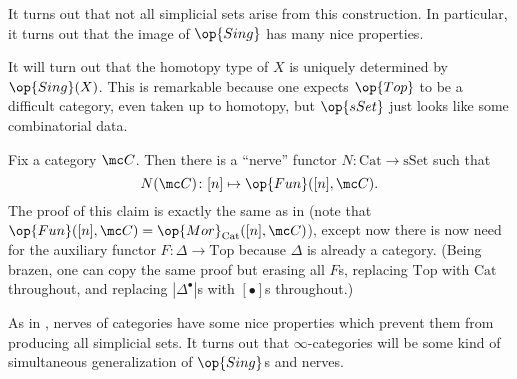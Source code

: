 \documentclass[../notes.tex]{subfiles}
\begin{document}
\begin{remark} \label{rem:more-sset-than-sing}
	It turns out that not all simplicial sets arise from this construction. In particular, it turns out that the image of $\op{Sing}$ has many nice properties. %
\end{remark}
\begin{remark}
	It will turn out that the homotopy type of $X$ is uniquely determined by $\op{Sing}(X)$. This is remarkable because one expects $\op{Top}$ to be a difficult category, even taken up to homotopy, but $\op{sSet}$ just looks like some combinatorial data.
\end{remark}
\begin{example}[nerve] \label{ex:nerve}
	Fix a category $\mc C$. Then there is a ``nerve'' functor $N\colon\mathrm{Cat}\to\mathrm{sSet}$ such that
	\[N(\mc C)\colon[n]\mapsto\op{Fun}([n],\mc C).\]
	The proof of this claim is exactly the same as in  (note that $\op{Fun}([n],\mc C)=\op{Mor}_{\mathrm{Cat}}([n],\mc C)$), except now there is now need for the auxiliary functor $F\colon\Delta\to\mathrm{Top}$ because $\Delta$ is already a category. (Being brazen, one can copy the same proof but erasing all $F$s, replacing $\mathrm{Top}$ with $\mathrm{Cat}$ throughout, and replacing $\left|\Delta^\bullet\right|$s with $[\bullet]$s throughout.)
\end{example}
\begin{remark}
	As in , nerves of categories have some nice properties which prevent them from producing all simplicial sets. It turns out that $\infty$-categories will be some kind of simultaneous generalization of $\op{Sing}$s and nerves.
\end{remark}
\end{document}
